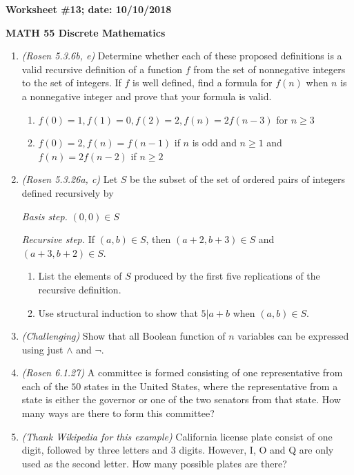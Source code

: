 \documentclass{article}
\begin{document}
{\bf Worksheet \#13; date: 10/10/2018}

{\bf MATH 55 Discrete Mathematics}

\begin{enumerate}
\item {\em (Rosen 5.3.6b, e)} Determine whether each of these proposed definitions is a valid recursive definition of a function $f$ from the set of nonnegative integers to the set of integers. If $f$ is well defined, find a formula for $f(n)$ when $n$ is a nonnegative integer and prove that your formula is valid.
\begin{enumerate}
\item $f(0) = 1, f(1) = 0, f(2) = 2, f(n) = 2f(n-3)$ for $n \ge 3$
\item $f(0) = 2, f(n) = f(n-1)$ if $n$ is odd and $n \ge 1$ and $f(n) = 2f(n-2)$ if $n \ge 2$
\end{enumerate}

\item {\em (Rosen 5.3.26a, c)} Let $S$ be the subset of the set of ordered pairs of integers defined recursively by

{\em Basis step.} $(0, 0) \in S$

{\em Recursive step.} If $(a, b) \in S$, then $(a + 2, b + 3) \in S$ and $(a + 3, b + 2) \in S$.

\begin{enumerate}
\item List the elements of $S$ produced by the first five replications of the recursive definition.
\item Use structural induction to show that $5 | a + b$ when $(a, b) \in S$.
\end{enumerate}

\item {\em (Challenging)} Show that all Boolean function of $n$ variables can be expressed using just $\wedge$ and $\neg$.

\item {\em (Rosen 6.1.27)} A committee is formed consisting of one representative from each of the $50$ states in the United States, where the representative from a state is either the governor or one of the two senators from that state. How many ways are there to form this committee?

\item {\em (Thank Wikipedia for this example)} California license plate consist of one digit, followed by three letters and 3 digits. However, I, O and Q are only used as the second letter. How many possible plates are there?


\end{enumerate}
\end{document}
